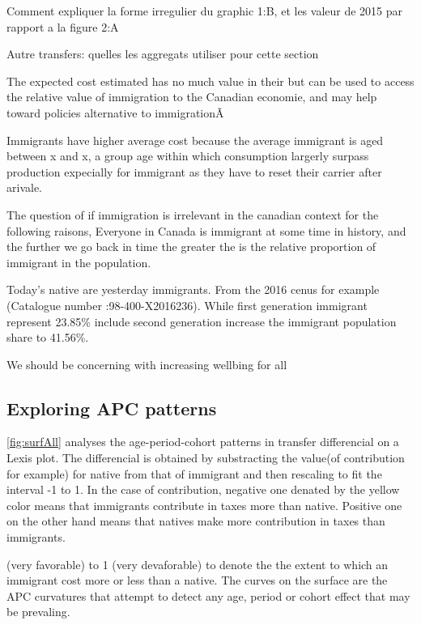 Comment expliquer la forme irregulier du graphic 1:B, et les valeur de 2015 par rapport a la figure 2:A

Autre transfers: quelles les aggregats utiliser pour cette section


The expected cost estimated has no much value in their but can be used to access the relative value of immigration to the Canadian economie, and may help toward policies alternative to immigrationÃ 


Immigrants have higher average cost because the average immigrant is aged between x and x, a group age within which consumption largerly surpass production expecially for immigrant as they have to reset their carrier after arivale.





The question of if immigration is irrelevant in the canadian context for the following raisons,
Everyone in Canada is immigrant at some time in history, and the further we go back in time the greater the is the relative proportion of immigrant in the population.



Today's native are yesterday immigrants. From the 2016 cenus for example (Catalogue number :98-400-X2016236). While first generation immigrant represent 23.85\% include second generation increase the immigrant population share to 41.56\%.

We should be concerning with increasing wellbing for all



\subsection{Exploring APC patterns}\label{sec:apc}
  \autoref{fig:surfAll} analyses the age-period-cohort patterns  in transfer differencial on a Lexis plot. The differencial is obtained by substracting the value(of contribution for example) for native from that of immigrant and then rescaling to fit the interval -1 to 1. In the case of contribution, negative one denated by the yellow color means that immigrants contribute in taxes more than native. Positive one on the other hand means that natives make more contribution in taxes than immigrants.

  (very favorable) to 1 (very devaforable) to denote the the extent to which an immigrant cost more or less than a native. The curves on the surface are the APC curvatures that attempt to detect any age, period or cohort effect that may be prevaling.

